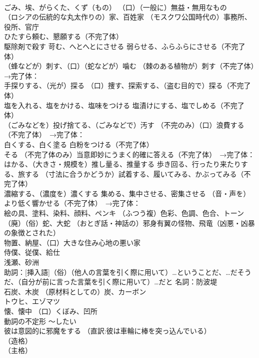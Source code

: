\documentclass[8pt]{extreport}
\begin{document}
\begin{CJK}{UTF8}{min}
\\	ごみ、埃、がらくた、くず（もの） （口）（一般に）無益・無用なもの
\\	（ロシアの伝統的な丸太作りの）家、百姓家 （モスクワ公国時代の）事務所、役所、官庁
\\	ひたすら頼む、懇願する（不完了体）
\\	駆除剤で殺す 苛む、へとへとにさせる 弱らせる、ふらふらにさせる（不完了体）
\\	（蜂などが）刺す、（口）（蛇などが）噛む （棘のある植物が）刺す（不完了体）　→完了体：
\\	手探りする、（光が）探る （口）捜す、探索する、（盗む目的で）探る（不完了体）
\\	塩を入れる、塩をかける、塩味をつける 塩漬けにする、塩でしめる（不完了体）
\\	（ごみなどを）投げ捨てる、（ごみなどで）汚す （不完のみ）（口）浪費する（不完了体）　→完了体：
\\	白くする、白く塗る 白粉をつける（不完了体）
\\	そる （不完了体のみ）当意即妙にうまく的確に答える（不完了体）　→完了体：
\\	はかる、（大きさ・規模を）推し量る、推量する 歩き回る、行ったり来たりする、旅する （寸法に合うかどうか）試着する、履いてみる、かぶってみる（不完了体）
\\	濃縮する、（濃度を）濃くする 集める、集中させる、密集させる （音・声を）より低く響かせる（不完了体）　→完了体：
\\	絵の具、塗料、染料、顔料、ペンキ （ふつう複）色彩、色調、色合、トーン
\\	（廃）（俗）蛇、大蛇 （おとぎ話・神話の）邪身有翼の怪物、飛竜（凶悪・凶暴の象徴とされた）
\\	物置、納屋、（口）大きな住み心地の悪い家
\\	侍僕、従僕、給仕
\\	浅瀬、砂洲
\\	助詞：[挿入語]（俗）（他人の言葉を引く際に用いて）…ということだ、…だそうだ、（自分が前に言った言葉を引く際に用いて）…だと 名詞：防波堤
\\	石炭、木炭 （原材料としての）炭、カーボン
\\	トウヒ、エゾマツ
\\	懐、懐中 （口）くぼみ、凹所
\\	動詞の不定形	〜したい
\\	彼は意図的に邪魔をする （直訳:彼は車輪に棒を突っ込んでいる）
\\	（造格） 
\\	（主格）	

\end{CJK}
\end{document}
